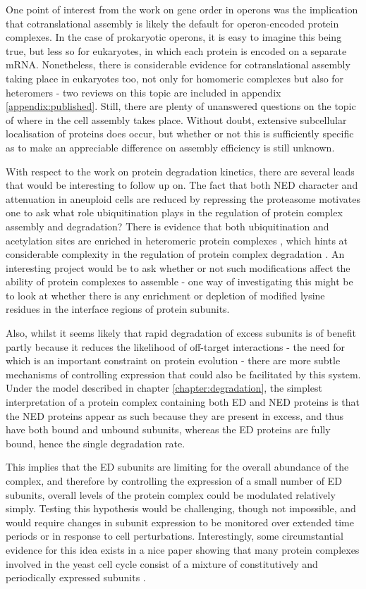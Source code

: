 \documentclass[a4paper,11pt,twoside,openright]{scrbook}
\begin{document}
One point of interest from the work on gene order in operons was the implication that cotranslational assembly is likely the default for operon-encoded protein complexes. In the case of prokaryotic operons, it is easy to imagine this being true, but less so for eukaryotes, in which each protein is encoded on a separate mRNA. Nonetheless, there is considerable evidence for cotranslational assembly taking place in eukaryotes too, not only for homomeric complexes but also for heteromers - two reviews on this topic are included in appendix \ref{appendix:published}. Still, there are plenty of unanswered questions on the topic of where in the cell assembly takes place. Without doubt, extensive subcellular localisation of proteins does occur, but whether or not this is sufficiently specific as to make an appreciable difference on assembly efficiency is still unknown.

With respect to the work on protein degradation kinetics, there are several leads that would be interesting to follow up on. The fact that both NED character and attenuation in aneuploid cells are reduced by repressing the proteasome motivates one to ask what role ubiquitination plays in the regulation of protein complex assembly and degradation? There is evidence that both ubiquitination and acetylation sites are enriched in heteromeric protein complexes \cite{Chen2014,Choudhary2009}, which hints at considerable complexity in the regulation of protein complex degradation \cite{Caron2005}. An interesting project would be to ask whether or not such modifications affect the ability of protein complexes to assemble - one way of investigating this might be to look at whether there is any enrichment or depletion of modified lysine residues in the interface regions of protein subunits.

Also, whilst it seems likely that rapid degradation of excess subunits is of benefit partly because it reduces the likelihood of off-target interactions  - the need for which is an important constraint on protein evolution \cite{Yang2012} - there are more subtle mechanisms of controlling expression that could also be facilitated by this system. Under the model described in chapter \ref{chapter:degradation}, the simplest interpretation of a protein complex containing both ED and NED proteins is that the NED proteins appear as such because they are present in excess, and thus have both bound and unbound subunits, whereas the ED proteins are fully bound, hence the single degradation rate.

This implies that the ED subunits are limiting for the overall abundance of the complex, and therefore by controlling the expression of a small number of ED subunits, overall levels of the protein complex could be modulated relatively simply. Testing this hypothesis would be challenging, though not impossible, and would require changes in subunit expression to be monitored over extended time periods or in response to cell perturbations. Interestingly, some circumstantial evidence for this idea exists in a nice paper showing that many protein complexes involved in the yeast cell cycle consist of a mixture of constitutively and periodically expressed subunits \cite{Lichtenberg2005}.
\end{document}
